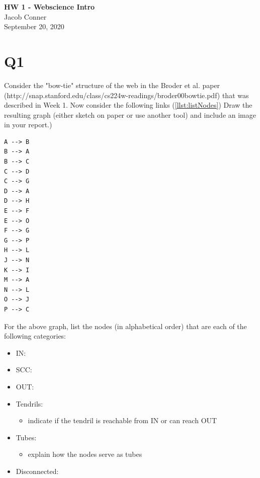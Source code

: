 \documentclass[12pt]{article}
\begin{document}
\begin{centering}
{\large\textbf{HW 1 - Webscience Intro}}\\ %
Jacob Conner\\                     %
September 20, 2020\\                      %
\end{centering}


\section*{Q1}
Consider the "bow-tie" structure of the web in the Broder et al. paper (http://snap.stanford.edu/class/cs224w-readings/broder00bowtie.pdf) that was described in Week 1.
Now consider the following links (\ref{llst:listNodes}) Draw the resulting graph (either sketch on paper or use another tool) and include an image in your report.)

\begin{lstlisting}[numbers=none, caption=Links, label=lst:listNodes]
A --> B
B --> A
B --> C
C --> D
C --> G
D --> A
D --> H
E --> F
E --> O
F --> G
G --> P
H --> L
J --> N
K --> I
M --> A
N --> L
O --> J
P --> C
\end{lstlisting}

For the above graph, list the nodes (in alphabetical order) that are each of the following categories:
\begin{itemize}
  \item IN:
  \item SCC:
  \item OUT:
  \item Tendrils:
	\begin{itemize}
		\item indicate if the tendril is reachable from IN or can reach OUT
	\end{itemize}
\item Tubes:
	\begin{itemize}
		\item explain how the nodes serve as tubes
	\end{itemize}
\item Disconnected:
\end{itemize}
\end{document}
